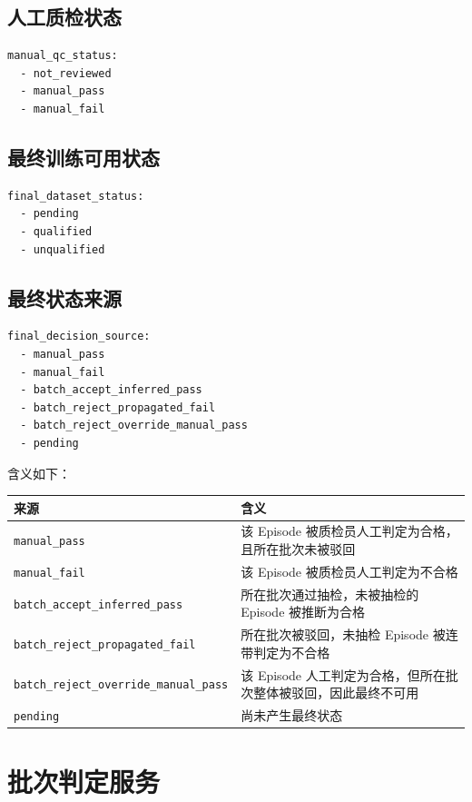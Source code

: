 \documentclass[UTF8,12pt,a4paper]{ctexart}
\begin{document}
\subsection{人工质检状态}

\begin{lstlisting}
manual_qc_status:
  - not_reviewed
  - manual_pass
  - manual_fail
\end{lstlisting}

\subsection{最终训练可用状态}

\begin{lstlisting}
final_dataset_status:
  - pending
  - qualified
  - unqualified
\end{lstlisting}

\subsection{最终状态来源}

\begin{lstlisting}
final_decision_source:
  - manual_pass
  - manual_fail
  - batch_accept_inferred_pass
  - batch_reject_propagated_fail
  - batch_reject_override_manual_pass
  - pending
\end{lstlisting}

含义如下：

\begin{longtable}{p{5cm}p{10cm}}
\toprule
来源 & 含义 \\
\midrule
\texttt{manual\_pass} & 该 Episode 被质检员人工判定为合格，且所在批次未被驳回 \\
\texttt{manual\_fail} & 该 Episode 被质检员人工判定为不合格 \\
\texttt{batch\_accept\_inferred\_pass} & 所在批次通过抽检，未被抽检的 Episode 被推断为合格 \\
\texttt{batch\_reject\_propagated\_fail} & 所在批次被驳回，未抽检 Episode 被连带判定为不合格 \\
\texttt{batch\_reject\_override\_manual\_pass} & 该 Episode 人工判定为合格，但所在批次整体被驳回，因此最终不可用 \\
\texttt{pending} & 尚未产生最终状态 \\
\bottomrule
\end{longtable}

\section{批次判定服务}
\end{document}
